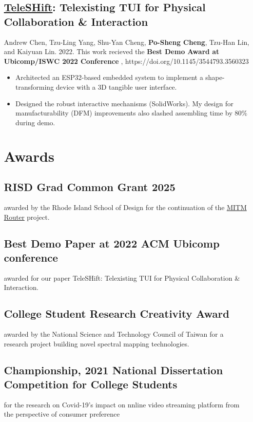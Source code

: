 \documentclass[12pt]{article}
\begin{document}
\subsection*{\href{https://bencer3283.github.io/portfolio/teleshift/}{\underline{TeleSHift}}: Telexisting TUI for Physical Collaboration \& Interaction}
    { \small
    {\scriptsize 
    Andrew Chen, Tzu-Ling Yang, Shu-Yan Cheng, \textbf{Po-Sheng Cheng}, Tzu-Han Lin, and Kaiyuan Lin. 2022. 
    This work recieved the \textbf{Best Demo Award at Ubicomp/ISWC 2022 Conference}%
    , https://doi.org/10.1145/3544793.3560323}
        \begin{itemize}
            \item Architected an ESP32-based embedded system to implement a shape-transforming device with a 3D tangible user interface.
            \item Designed the robust interactive mechanisms (SolidWorks). My design for manufacturability (DFM) improvements also slashed assembling time by 80\% during demo.
        \end{itemize}
        }
        
\section*{Awards}
\subsection*{RISD Grad Common Grant 2025}
{\small awarded by the Rhode Island School of Design for the continuation of the \href{https://bencer3283.github.io/portfolio/mitm/}{\underline{MITM Router}} project.}
\subsection*{Best Demo Paper at 2022 ACM Ubicomp conference}
{\small awarded for our paper TeleSHift: Telexisting TUI for Physical Collaboration \& Interaction.}
\subsection*{College Student Research Creativity Award}
{\small awarded by the National Science and Technology Council of Taiwan for a research project building novel spectral mapping technologies. }
\subsection*{Championship, 2021 National Dissertation Competition for College Students}
{\small for the research on Covid-19's impact on nnline video streaming platform from the perspective of consumer preference}
\end{document}
